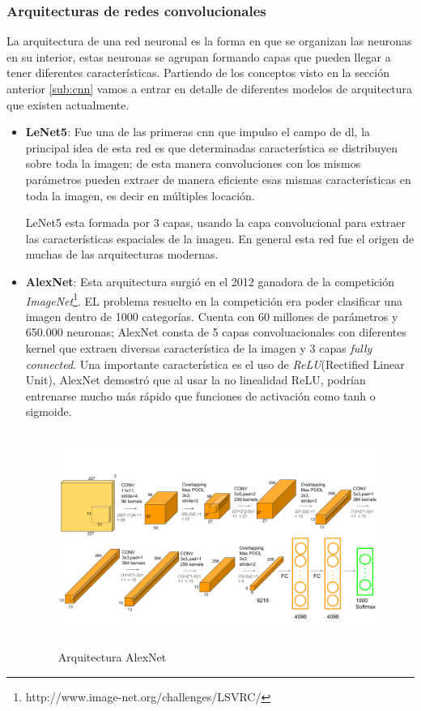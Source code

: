 \subsubsection*{Arquitecturas de redes convolucionales}\label{sub:arquitecturacnn}
La arquitectura de una red neuronal es la forma en que se organizan  las neuronas en su interior, estas neuronas se agrupan formando capas que pueden llegar a tener diferentes características. Partiendo de los conceptos visto en la sección anterior \ref{sub:cnn} vamos a entrar en detalle de diferentes modelos de arquitectura que existen actualmente.

\begin{itemize}
\item \textbf{LeNet5}: Fue una de las primeras \ac{cnn} que impulso el campo de \ac{dl}, la principal idea de esta red es que determinadas característica se distribuyen sobre toda la imagen; de esta manera convoluciones con los mismos parámetros pueden extraer de manera eficiente esas mismas características en toda la imagen, es decir en múltiples locación. 

LeNet5 esta formada por 3 capas, usando la capa convolucional para extraer las características espaciales de la imagen. En general esta red fue el origen de muchas de las arquitecturas modernas.

\item \textbf{AlexNet}: Esta arquitectura surgió en el 2012 ganadora de la competición \textit{ImageNet}\footnote{http://www.image-net.org/challenges/LSVRC/}. EL problema resuelto en la competición era poder clasificar una imagen dentro de 1000 categorías. Cuenta con 60 millones de parámetros y 650.000 neuronas; AlexNet consta de 5 capas convoluacionales con diferentes kernel que extraen diversas característica de la imagen  y 3 capas \textit{fully connected}. Una importante característica es el uso de \textit{ReLU}(Rectified Linear Unit),  AlexNet demostró que al usar la no linealidad ReLU,  podrían entrenarse mucho más rápido que  funciones de activación como  tanh o sigmoide.

\begin{figure}[H]
 \centering
  \includegraphics[height=7cm,keepaspectratio=true,clip=true]{imagenes/MarcoTeorico/AlexNet-1.png}
  \caption{Arquitectura AlexNet}
	\label{Fig:alexnet}
\end{figure}



\end{itemize}
